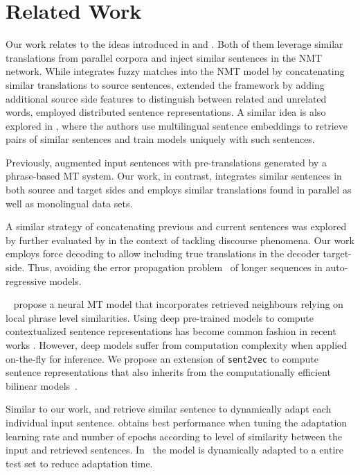 \section{Related Work}
\label{sec:related-chap8}

Our work relates to the ideas introduced in \citet{bulte19neural} and \citet{xu20boosting}.
Both of them leverage similar translations from parallel corpora and inject similar sentences in the NMT network.
While \citet{bulte19neural} integrates fuzzy matches into the NMT model by concatenating similar translations to source sentences, \citet{xu20boosting} extended the framework by adding additional source side features to distinguish between related and unrelated words, employed distributed sentence representations.
A similar idea is also explored in \citet{schwenk2019ccmatrix}, where the authors use multilingual sentence embeddings to retrieve pairs of similar sentences and train models uniquely with such sentences.

Previously, \citet{Niehues16pretranslation} augmented input sentences with pre-translations generated by a phrase-based MT system.
Our work, in contrast, integrates similar sentences in both source and target sides and employs similar translations found in parallel as well as monolingual data sets. 

A similar strategy of concatenating previous and current sentences was explored by \citet{tiedemann17neural} further evaluated by \citet{bawden18evaluating}
in the context of tackling discourse phenomena. 
Our work employs force decoding to allow including true translations in the decoder target-side.
Thus, avoiding the error propagation problem~\cite{Ranzato15sequence} of longer sequences in auto-regressive models.

~\citet{bapna19non} propose a neural MT model that incorporates
retrieved neighbours relying on local phrase level similarities.
%
Using deep pre-trained models \cite{peters18deep,radford19language,Devlin19bert,Conneau19crosslingual} to compute contextualized sentence representations has become common fashion in recent works \cite{feng20languageagnostic,chang20pretraining}.
However, deep models suffer from computation complexity when applied on-the-fly for inference.
We propose an extension of \texttt{sent2vec} \cite{pagliardini18unsupervised} to compute sentence representations that also inherits from the computationally efficient bilinear models~\cite{Mikolov13efficient,Mikolov13distributed,Pennington14glove}. 

Similar to our work, \citet{Farajian17multidomain} and \citet{Li18onesentence} retrieve similar sentence to dynamically adapt each individual input sentence. 
\citet{Farajian17multidomain} obtains best performance when tuning the adaptation learning rate and number of epochs according to level of similarity between the input and retrieved sentences.
In~\citet{xu19lexical} the model is dynamically adapted to a entire test set to reduce adaptation time.

